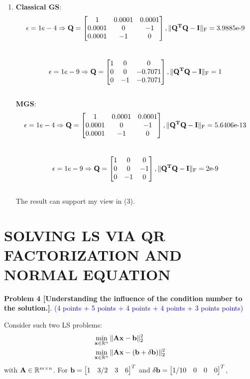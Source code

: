 \documentclass[english,onecolumn]{IEEEtran}
\begin{document}
\begin{enumerate}
    
    \item
    \textbf{ Classical GS}:
    $$
    \epsilon = 1e-4 \Rightarrow \bf{Q} = 
    \begin{bmatrix}
    1 & 0.0001 & 0.0001 \\
    0.0001 & 0 & -1 \\
    0.0001 & -1 & 0 
    \end{bmatrix}, 
    \|{\bf Q}^T {\bf Q} - {\bf I}\|_{\text{F}} = \text{3.9885e-9}
    $$\\
    $$
    \epsilon = 1e-9 \Rightarrow \bf{Q} = 
    \begin{bmatrix}
    1 & 0 & 0 \\
    0 & 0 & -0.7071 \\
    0 & -1 & -0.7071
    \end{bmatrix}, 
    \|{\bf Q}^T {\bf Q} - {\bf I}\|_{\text{F}} = \text{1}
    $$\\
    \textbf{ MGS}:
    $$
    \epsilon = 1e-4 \Rightarrow \bf{Q} = 
    \begin{bmatrix}
    1 & 0.0001 & 0.0001 \\
    0.0001 & 0 & -1 \\
    0.0001 & -1 & 0 
    \end{bmatrix}, 
    \|{\bf Q}^T {\bf Q} - {\bf I}\|_{\text{F}} = \text{5.6406e-13}
    $$\\
    $$
    \epsilon = 1e-9 \Rightarrow \bf{Q} = 
    \begin{bmatrix}
    1 & 0 & 0 \\
    0 & 0 & -1 \\
    0 & -1 & 0
    \end{bmatrix}, 
    \|{\bf Q}^T {\bf Q} - {\bf I}\|_{\text{F}} = \text{2e-9}
    $$\\
    The result can support my view in (3).
    
\end{enumerate}




\newpage
\section{SOLVING LS VIA QR FACTORIZATION AND NORMAL EQUATION}
\noindent\textbf{Problem 4 [Understanding the influence of the condition number to the solution.]}. \textcolor{blue}{(4 points + 5 points + 4 points + 4 points + 3 points points) }

Consider such two LS problems:
\begin{align}
    &\min_{{\bf x}\in\mathbb{R}^n} \|{\bf Ax - b}\|_2^2 \label{axb}\\
    &\min_{{\bf x}\in\mathbb{R}^n} \|{\bf A}{\bf x} - ({\bf b}+\delta{\bf b })\|_2^2 \nonumber%
\end{align}
with ${\bf A}\in \mathbb{R}^{m\times n}$. For ${\bf b} = \begin{bmatrix}
    1 & 3/2 & 3 & 6
    \end{bmatrix}^T$
    and 
    $\delta{\bf b} = \begin{bmatrix}
    1/10 & 0 & 0 & 0
    \end{bmatrix}^T$,
\end{document}
